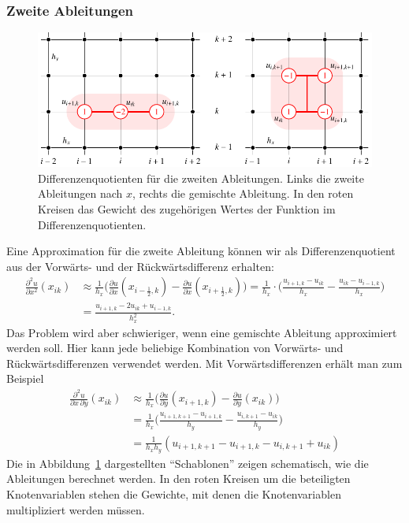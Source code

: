 \subsubsection{Zweite Ableitungen}
\begin{figure}
\centering
\includegraphics{chapters/70-pde/images/diff2.pdf}
\caption{Differenzenquotienten für die zweiten Ableitungen.
Links die zweite Ableitungen nach $x$, rechts die gemischte Ableitung.
In den roten Kreisen das Gewicht des zugehörigen Wertes der Funktion
im Differenzenquotienten.
\label{buch:pde:diff2}}
\end{figure}
Eine Approximation für die zweite Ableitung können wir als
Differenzenquotient aus der Vorwärts- und der Rückwärtsdifferenz
erhalten:
\begin{align*}
\frac{\partial^2 u}{\partial x^2}(x_{ik})
&\approx
\frac{1}{h_x}\biggl(
\frac{\partial u}{\partial x}(x_{i-\frac12,k})
-
\frac{\partial u}{\partial x}(x_{i+\frac12,k})
\biggr)
=
\frac{1}{h_x}
\cdot
\biggl(
\frac{u_{i+1,k}-u_{ik}}{h_x}
-
\frac{u_{ik}-u_{i-1,k}}{h_x}
\biggr)
\\
&=
\frac{u_{i+1,k}-2u_{ik}+u_{i-1,k}}{h_x^2}.
\end{align*}
Das Problem wird aber schwieriger, wenn eine gemischte Ableitung
approximiert werden soll.
Hier kann jede beliebige Kombination von Vorwärts- und Rückwärtsdifferenzen
verwendet werden.
Mit Vorwärtsdifferenzen erhält man zum Beispiel
\begin{align*}
\frac{\partial^2u}{\partial x\,\partial y}(x_{ik})
&\approx
\frac{1}{h_x}\biggl(
\frac{\partial u}{\partial y}(x_{i+1,k})
-
\frac{\partial u}{\partial y}(x_{ik})
\biggr)
\\
&=
\frac{1}{h_x}\biggl(
\frac{u_{i+1,k+1}-u_{i+1,k}}{h_y}
-
\frac{u_{i,k+1}-u_{ik}}{h_y}
\biggr)
\\
&=
\frac{1}{h_xh_y}(
u_{i+1,k+1}-u_{i+1,k}
-
u_{i,k+1}+u_{ik}
)
\end{align*}
Die in Abbildung~\ref{buch:pde:diff2} dargestellten ``Schablonen''
zeigen schematisch, wie die Ableitungen berechnet werden.
In den roten Kreisen um die beteiligten Knotenvariablen stehen die
Gewichte, mit denen die Knotenvariablen multipliziert werden müssen.

